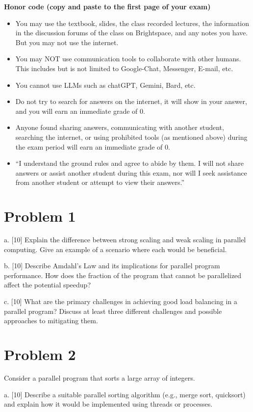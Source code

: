\documentclass{article}
\begin{document}
\textbf{Honor code (copy and paste to the first page of your exam)}
\begin{itemize}
    \item You may use the textbook, slides, the class recorded lectures, the information in the discussion forums of the class on Brightspace, and any notes you have. But you may not use the internet.
    \item You may NOT use communication tools to collaborate with other humans. This includes but is not limited to Google-Chat, Messenger, E-mail, etc.
    \item You cannot use LLMs such as chatGPT, Gemini, Bard, etc.
    \item Do not try to search for answers on the internet, it will show in your answer, and you will earn an immediate grade of 0.
    \item Anyone found sharing answers, communicating with another student, searching the internet, or using prohibited tools (as mentioned above) during the exam period will earn an immediate grade of 0.
    \item “I understand the ground rules and agree to abide by them. I will not share answers or assist another student during this exam, nor will I seek assistance from another student or attempt to view their answers.”
\end{itemize}

\section*{Problem 1}
a. [10]  Explain the difference between strong scaling and weak scaling in parallel computing.  Give an example of a scenario where each would be beneficial.

b. [10] Describe Amdahl's Law and its implications for parallel program performance. How does the fraction of the program that cannot be parallelized affect the potential speedup?

c. [10] What are the primary challenges in achieving good load balancing in a parallel program?  Discuss at least three different challenges and possible approaches to mitigating them.


\section*{Problem 2}
Consider a parallel program that sorts a large array of integers.

a. [10]  Describe a suitable parallel sorting algorithm (e.g., merge sort, quicksort) and explain how it would be implemented using threads or processes.
\end{document}
